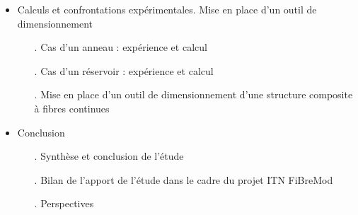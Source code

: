 \begin{itemize}
\item Calculs et confrontations expérimentales. Mise en place d'un outil de dimensionnement
\begin{itemize}
    \item[.] Cas d'un anneau : expérience et calcul
    \item[.] Cas d'un réservoir : expérience et calcul
    \item[.] Mise en place d'un outil de dimensionnement d'une structure composite à fibres continues
\end{itemize}

\item Conclusion
\begin{itemize}
    \item[.] Synthèse et conclusion de l'étude
    \item[.] Bilan de l'apport de l'étude dans le cadre du projet ITN FiBreMod
    \item[.] Perspectives
\end{itemize}

\end{itemize}